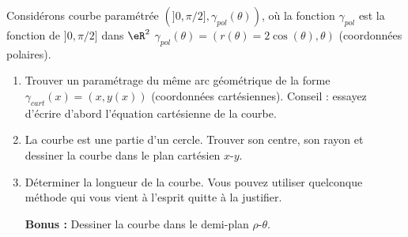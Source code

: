 \begin{exercice}\label{exoDS2011-0004}

Considérons  courbe paramétrée $(]0,\pi/2], \gamma_{pol}(\theta))$, où la fonction $\gamma_{pol}$ est la fonction de $]0,\pi/2]$ dans $\eR^2$  $\gamma_{pol}(\theta)=(r(\theta)=2\cos(\theta), \theta)$ (coordonnées polaires).
\begin{enumerate}
\item Trouver un paramétrage du même arc géométrique de la forme $\gamma_{cart}(x)=(x, y(x))$ (coordonnées cartésiennes). Conseil : essayez d'écrire d'abord l'équation cartésienne de la courbe.
\item La courbe est une partie d'un cercle. Trouver son centre, son rayon et dessiner la courbe dans le plan cartésien $x$-$y$. 
\item Déterminer la longueur de la courbe. Vous pouvez utiliser quelconque méthode qui vous vient à l'esprit quitte à la justifier.
\item[\textbf{Bonus :}] Dessiner la courbe dans le demi-plan $\rho$-$\theta$.    
\end{enumerate}
\end{exercice}
